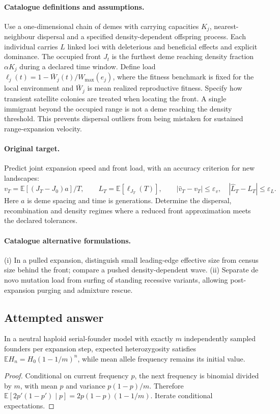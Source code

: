 \documentclass[11pt]{article}
\begin{document}
\paragraph{Catalogue definitions and assumptions.}
Use a one-dimensional chain of demes with carrying capacities $K_j$, nearest-neighbour dispersal and a specified density-dependent offspring process. Each individual carries $L$ linked loci with deleterious and beneficial effects and explicit dominance. The occupied front $J_t$ is the furthest deme reaching density fraction $\alpha K_j$ during a declared time window. Define load $\ell_j(t)=1-\bar W_j(t)/W_{\max}(e_j)$, where the fitness benchmark is fixed for the local environment and $\bar W_j$ is mean realized reproductive fitness. Specify how transient satellite colonies are treated when locating the front. A single immigrant beyond the occupied range is not a deme reaching the density threshold. This prevents dispersal outliers from being mistaken for sustained range-expansion velocity.
\paragraph{Original target.}
Predict joint expansion speed and front load, with an accuracy criterion for new landscapes:
\[
 v_T=\mathbb{E}[(J_T-J_0)a]/T,\qquad
 L_T=\mathbb{E}[\ell_{J_T}(T)],\qquad
 |\widehat v_T-v_T|\le\varepsilon_v,
 \quad |\widehat L_T-L_T|\le\varepsilon_L.
\]
Here $a$ is deme spacing and time is generations. Determine the dispersal, recombination and density regimes where a reduced front approximation meets the declared tolerances.
\paragraph{Catalogue alternative formulations.}
(i) In a pulled expansion, distinguish small leading-edge effective size from census size behind the front; compare a pushed density-dependent wave. (ii) Separate de novo mutation load from surfing of standing recessive variants, allowing post-expansion purging and admixture rescue.
\subsection{Attempted answer}
\begin{proposition}
In a neutral haploid serial-founder model with exactly $m$ independently sampled founders per expansion step, expected heterozygosity satisfies $\mathbb{E} H_n=H_0(1-1/m)^n$, while mean allele frequency remains its initial value.
\end{proposition}
\begin{proof}
Conditional on current frequency $p$, the next frequency is binomial divided by $m$, with mean $p$ and variance $p(1-p)/m$. Therefore $\mathbb{E}[2p\prime(1-p\prime)\mid p]=2p(1-p)(1-1/m)$. Iterate conditional expectations.
\end{proof}
\end{document}
